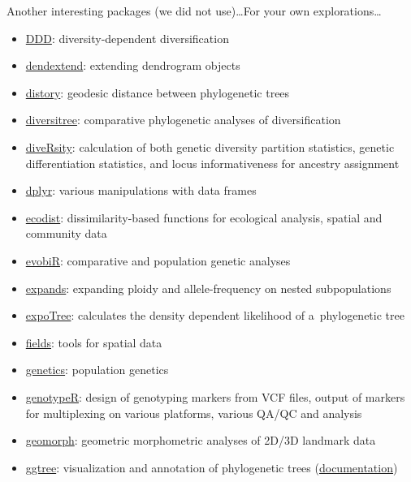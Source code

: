 \documentclass[compress, ucs, xelatex, 11pt, xcolor=svgnames,
	hyperref={
		bookmarks=true,
		unicode=true,
		colorlinks=true,
		pdftitle={Molecular data in R},
		plainpages=false,
		pdfauthor={Vojtech Zeisek},
		pdfsubject={Course about phylogeny and evolution in R},
		pdfcreator={XeLaTeX},
		pdfkeywords={R, evolution, phylogeny, molecular data},
		linkcolor=Tomato,
		anchorcolor=SaddleBrown,
		citecolor=Goldenrod,
		filecolor=DarkMagenta,
		menucolor=Sienna,
		urlcolor=DarkTurquoise,
		pdftex},
	url={hyphens, lowtilde} %
	]{beamer}
\begin{document}
\begin{frame}[allowframebreaks]{Another interesting packages (we did not use)\ldots}{For your own explorations\ldots}
\begin{itemize}
		\item \href{https://CRAN.R-project.org/package=DDD}{DDD}: diversity-dependent diversification
		\item \href{https://CRAN.R-project.org/package=dendextend}{dendextend}: extending dendrogram objects
		\item \href{https://CRAN.R-project.org/package=distory}{distory}: geodesic distance between phylogenetic trees
		\item \href{https://CRAN.R-project.org/package=diversitree}{diversitree}: comparative phylogenetic analyses of diversification
		\item \href{https://CRAN.R-project.org/package=diveRsity}{diveRsity}: calculation of both genetic diversity partition statistics, genetic differentiation statistics, and locus informativeness for ancestry assignment
		\item \href{https://CRAN.R-project.org/package=dplyr}{dplyr}: various manipulations with data frames
		\item \href{https://CRAN.R-project.org/package=ecodist}{ecodist}: dissimilarity-based functions for ecological analysis, spatial and community data
		\item \href{https://CRAN.R-project.org/package=evobiR}{evobiR}: comparative and population genetic analyses
		\item \href{https://CRAN.R-project.org/package=expands}{expands}: expanding ploidy and allele-frequency on nested subpopulations
		\item \href{https://CRAN.R-project.org/package=expoTree}{expoTree}: calculates the density dependent likelihood of a~phylogenetic tree
		\item \href{https://CRAN.R-project.org/package=fields}{fields}: tools for spatial data
		\item \href{https://CRAN.R-project.org/package=genetics}{genetics}: population genetics
		\item \href{https://CRAN.R-project.org/package=genotypeR}{genotypeR}: design of genotyping markers from VCF files, output of markers for multiplexing on various platforms, various QA/QC and analysis
		\item \href{https://CRAN.R-project.org/package=geomorph}{geomorph}: geometric morphometric analyses of 2D/3D landmark data
		\item \href{https://bioconductor.org/packages/release/bioc/html/ggtree.html}{ggtree}: visualization and annotation of phylogenetic trees (\href{https://guangchuangyu.github.io/software/ggtree/documentation/}{documentation})

\end{itemize}
\end{frame}
\end{document}
